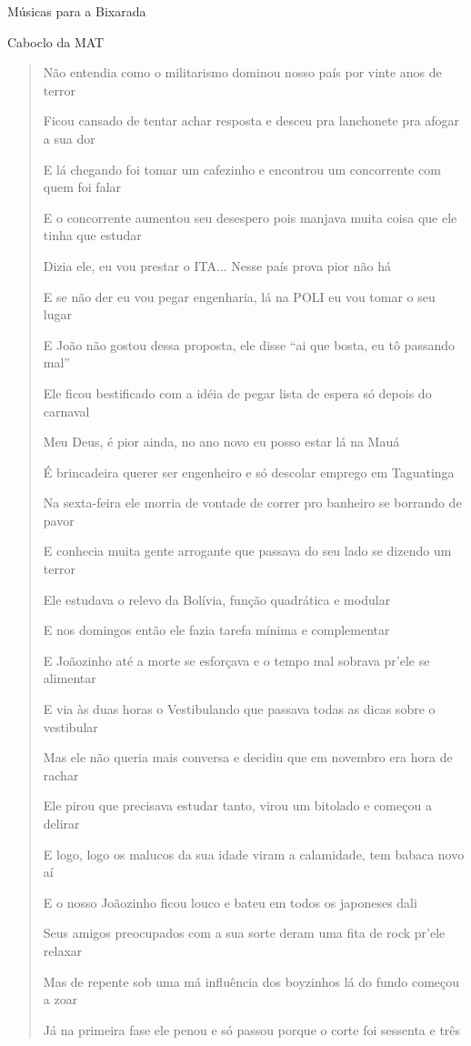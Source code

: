 \begin{secao}{Músicas para a Bixarada}
\begin{subsecao}{Caboclo da MAT}
\begin{verse}
Não entendia como o militarismo dominou nosso país por vinte anos de terror

Ficou cansado de tentar achar resposta e desceu pra lanchonete pra afogar a sua
dor

E lá chegando foi tomar um cafezinho e encontrou um concorrente com quem foi
falar

E o concorrente aumentou seu desespero pois manjava muita coisa que ele tinha
que estudar

Dizia ele, eu vou prestar o ITA... Nesse país prova pior não há

E se não der eu vou pegar engenharia, lá na POLI eu vou tomar o seu lugar

E João não gostou dessa proposta, ele disse ``ai que bosta, eu tô passando mal''

Ele ficou bestificado com a idéia de pegar lista de espera só depois do
carnaval

Meu Deus, é pior ainda, no ano novo eu posso estar lá na Mauá

É brincadeira querer ser engenheiro e só descolar emprego em Taguatinga

Na sexta-feira ele morria de vontade de correr pro banheiro se borrando de
pavor

E conhecia muita gente arrogante que passava do seu lado se dizendo um terror

Ele estudava o relevo da Bolívia, função quadrática e modular

E nos domingos então ele fazia tarefa mínima e complementar

E Joãozinho até a morte se esforçava e o tempo mal sobrava pr'ele se alimentar

E via às duas horas o Vestibulando que passava todas as dicas sobre o
vestibular

Mas ele não queria mais conversa e decidiu que em novembro era hora de rachar

Ele pirou que precisava estudar tanto, virou um bitolado e começou a delirar

E logo, logo os malucos da sua idade viram a calamidade, tem babaca novo aí

E o nosso Joãozinho ficou louco e bateu em todos os japoneses dali

Seus amigos preocupados com a sua sorte deram uma fita de rock pr'ele relaxar

Mas de repente sob uma má influência dos boyzinhos lá do fundo começou a zoar

Já na primeira fase ele penou e só passou porque o corte foi sessenta e três


\end{verse}
\end{subsecao}
\end{secao}
